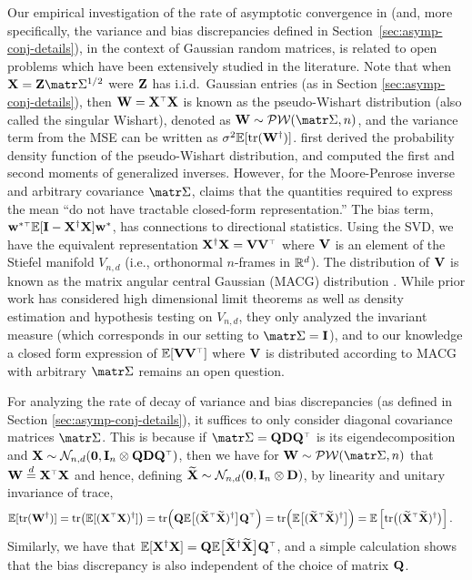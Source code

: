 Our empirical investigation of the rate of asymptotic convergence in  (and, more
specifically, the variance and bias discrepancies defined in
Section~\ref{sec:asymp-conj-details}), in the context of
Gaussian random matrices, is related to open problems which have been
extensively studied in the literature. Note that when
$\X=\Z\Sigmab^{1/2}$ were $\mathbf Z$ has i.i.d.~Gaussian entries (as in
Section \ref{sec:asymp-conj-details}), then $\W=\X^\top\X$ is known as the
pseudo-Wishart distribution (also called the singular Wishart),
denoted as $\W \sim \Pc\Wc(\Sigmab, n)$, and the variance
term from the MSE can be written as $\sigma^2\mathbb E[\mathrm{tr}(\mathbf W^\dagger)]$.
\cite{srivastava2003} first derived the probability density function of the
pseudo-Wishart distribution, and
\cite{cook2011} computed the first and second moments of generalized
inverses. However, for the Moore-Penrose inverse and arbitrary
covariance $\Sigmab$, \cite{cook2011} claims that the quantities required to
express the mean ``do not have tractable closed-form representation.''
The bias term, $\w^{*\top}\E[\I-\X^\dagger\X]\w^*$, has connections to
directional statistics.  Using the SVD,
we have the equivalent representation $\X^\dagger \X = \V \V^\top$ where $\mathbf V$
is an element of the Stiefel manifold $V_{n,d}$ (i.e., orthonormal $n$-frames
in $\mathbb R^d$).  The distribution of $\mathbf V$ is known as the matrix angular central
Gaussian (MACG) distribution \citep{chikuse1990matrix}. While prior work has
considered high dimensional limit theorems \citep{CHIKUSE1991145} as well as
density estimation and hypothesis testing \citep{CHIKUSE1998188} on $V_{n,d}$,
they only analyzed the invariant measure (which corresponds in our setting to
$\Sigmab = \I$), and to our knowledge a closed form expression of
$\E[\V\V^\top]$ where $\mathbf V$ is distributed according to MACG with arbitrary
$\Sigmab$ remains an open question.

For analyzing the rate of decay of variance and bias discrepancies (as
defined in Section \ref{sec:asymp-conj-details}), it suffices to only consider diagonal
covariance matrices $\Sigmab$.  This is because if $\Sigmab = \Q \D \Q^\top$ is
its eigendecomposition and $\X\sim\Nc_{n,d}(\zero, \I_n \otimes \Q\D\Q^\top)$,
then we have for $\W \sim \Pc\Wc(\Sigmab, n)$ that $\W \overset{d}{=} \X^\top
  \X$ and hence, defining $\widetilde{\mathbf{X}}\sim\mathcal{N}_{n,d}(\mathbf 0,\mathbf I_n \otimes \mathbf D)$, by linearity
and unitary invariance of trace,
\begin{align*}
  \E[\tr(\W^\dagger)]
   & = \tr\big( \E[(\X^\top\X)^\dagger] \big)
  = \tr\Big( \Q\E\big[(\Xt^\top\Xt)^\dagger\big]\Q^\top \Big)
  = \tr\Big( \E\big[(\Xt^\top\Xt)^\dagger\big] \Big)
  = \E\left[\tr \big((\Xt^\top\Xt)^\dagger\big) \right].
\end{align*}
Similarly, we have that $\E[\X^\dagger\X]=\Q\E\big[\Xt^\dagger\Xt\big]\Q^\top$,
and a simple calculation shows that the bias discrepancy is
also independent of the choice of matrix $\mathbf Q$.

